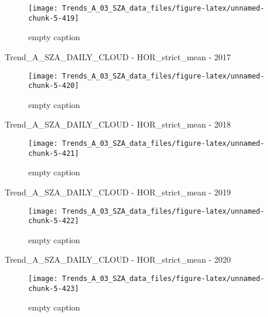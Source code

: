 \documentclass[
  10pt,
  a4paper,oneside]{article}
\begin{document}
\begin{figure}[!ht]

{\centering \texttt{[image: Trends\_A\_03\_SZA\_data\_files/figure-latex/unnamed-chunk-5-419]} 

}

\caption{ empty caption }\label{fig:unnamed-chunk-5-419}
\end{figure}

Trend\_A\_SZA\_DAILY\_CLOUD - HOR\_strict\_mean - 2017

\begin{figure}[!ht]

{\centering \texttt{[image: Trends\_A\_03\_SZA\_data\_files/figure-latex/unnamed-chunk-5-420]} 

}

\caption{ empty caption }\label{fig:unnamed-chunk-5-420}
\end{figure}

Trend\_A\_SZA\_DAILY\_CLOUD - HOR\_strict\_mean - 2018

\begin{figure}[!ht]

{\centering \texttt{[image: Trends\_A\_03\_SZA\_data\_files/figure-latex/unnamed-chunk-5-421]} 

}

\caption{ empty caption }\label{fig:unnamed-chunk-5-421}
\end{figure}

Trend\_A\_SZA\_DAILY\_CLOUD - HOR\_strict\_mean - 2019

\begin{figure}[!ht]

{\centering \texttt{[image: Trends\_A\_03\_SZA\_data\_files/figure-latex/unnamed-chunk-5-422]} 

}

\caption{ empty caption }\label{fig:unnamed-chunk-5-422}
\end{figure}

Trend\_A\_SZA\_DAILY\_CLOUD - HOR\_strict\_mean - 2020

\begin{figure}[!ht]

{\centering \texttt{[image: Trends\_A\_03\_SZA\_data\_files/figure-latex/unnamed-chunk-5-423]} 

}

\caption{ empty caption }\label{fig:unnamed-chunk-5-423}
\end{figure}
\end{document}
